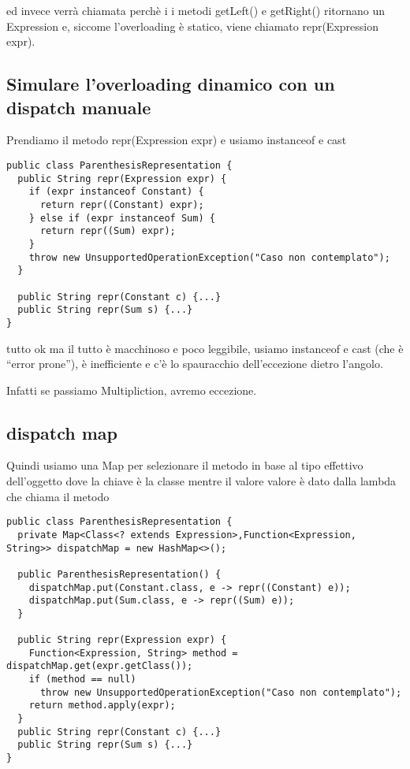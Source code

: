 ed invece verrà chiamata perchè i i metodi getLeft() e getRight() ritornano un Expression e, siccome l'overloading è statico, viene chiamato repr(Expression expr).

\subsection{Simulare l’overloading dinamico con un dispatch manuale}

Prendiamo il metodo repr(Expression expr) e usiamo instanceof e cast
\begin{lstlisting}
public class ParenthesisRepresentation {
  public String repr(Expression expr) {
    if (expr instanceof Constant) {
      return repr((Constant) expr);
    } else if (expr instanceof Sum) {
      return repr((Sum) expr);
    }
    throw new UnsupportedOperationException("Caso non contemplato");
  }
  
  public String repr(Constant c) {...}
  public String repr(Sum s) {...}
}
\end{lstlisting}

tutto ok ma il tutto è macchinoso e poco leggibile, usiamo instanceof e cast (che è “error prone”), è inefficiente e c'è lo spauracchio dell'eccezione dietro 
l'angolo.

Infatti se passiamo Multipliction, avremo eccezione.

\subsection{dispatch map}

Quindi usiamo una Map per selezionare il metodo in base al tipo effettivo dell’oggetto dove la chiave è la classe mentre il valore valore è dato dalla lambda 
che chiama il metodo
\begin{lstlisting}
public class ParenthesisRepresentation {
  private Map<Class<? extends Expression>,Function<Expression, String>> dispatchMap = new HashMap<>();

  public ParenthesisRepresentation() {
    dispatchMap.put(Constant.class, e -> repr((Constant) e));
    dispatchMap.put(Sum.class, e -> repr((Sum) e));
  }

  public String repr(Expression expr) {
    Function<Expression, String> method = dispatchMap.get(expr.getClass());
    if (method == null)
      throw new UnsupportedOperationException("Caso non contemplato");
    return method.apply(expr);
  }
  public String repr(Constant c) {...}
  public String repr(Sum s) {...}
}
\end{lstlisting}

